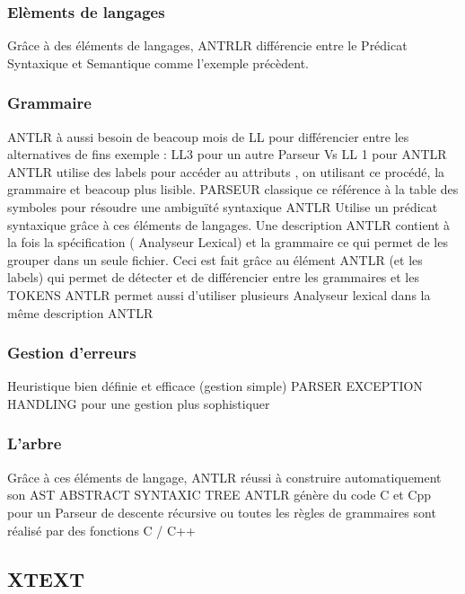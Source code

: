 \documentclass{article}
\begin{document}
\subsubsection{Elèments de langages}
	Grâce à des éléments de langages, ANTRLR différencie entre  le Prédicat Syntaxique et Semantique  comme l’exemple précèdent.
\subsubsection{Grammaire}
	ANTLR à aussi besoin de beacoup mois de LL pour différencier entre les alternatives de fins
exemple : LL3 pour un autre Parseur Vs LL 1 pour ANTLR
ANTLR utilise des labels pour accéder au attributs , on utilisant ce procédé, la grammaire et beacoup plus lisible.
PARSEUR classique  ce référence à la table des symboles pour résoudre une ambiguïté  syntaxique
ANTLR  Utilise un prédicat syntaxique grâce à ces éléments de langages.
Une description ANTLR contient à la fois la spécification ( Analyseur Lexical) et la grammaire ce qui permet de les grouper dans un seule fichier. Ceci est fait grâce au élément ANTLR (et les labels) qui permet de détecter et de différencier entre les grammaires et les TOKENS
ANTLR permet aussi d’utiliser plusieurs Analyseur lexical dans la même description ANTLR
\subsubsection{Gestion d'erreurs}
	Heuristique bien définie et efficace (gestion simple)
	PARSER EXCEPTION HANDLING pour une gestion plus sophistiquer
\subsubsection{L'arbre}
	Grâce à ces éléments de langage, ANTLR réussi à construire automatiquement son AST ABSTRACT SYNTAXIC TREE
ANTLR génère du code C et Cpp pour un Parseur de descente récursive ou toutes les 
règles de grammaires sont réalisé par des fonctions C / C++

\subsection{XTEXT}
\end{document}
